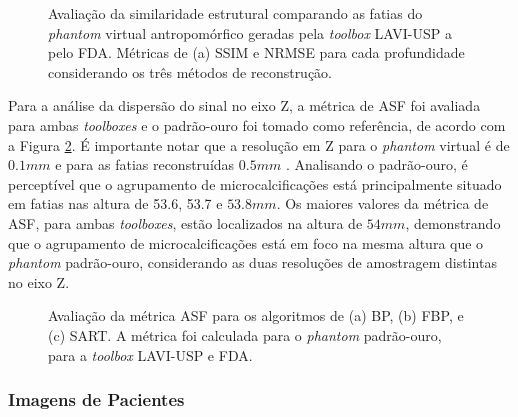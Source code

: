 \begin{figure}[!ht]
	\centering	
	\caption{ Avaliação da similaridade estrutural comparando as fatias do \textit{phantom} virtual antropomórfico geradas pela \textit{toolbox} LAVI-USP a pelo \acs{FDA}. Métricas de (a) \acs{SSIM} e \acs{NRMSE} para cada profundidade considerando os três métodos de reconstrução.}
	\hfill
	\label{fig:imgCap6VCTSSIMMSE}
\end{figure}


Para a análise da dispersão do sinal no eixo Z, a métrica de \acs{ASF} foi avaliada para ambas \textit{toolboxes} e o padrão-ouro foi tomado como referência, de acordo com a Figura \ref{fig:imgCap6VCTASF}. É importante notar que a resolução em Z para o \textit{phantom} virtual é de $0.1mm$ e para as fatias reconstruídas $0.5 mm$ . Analisando o padrão-ouro, é perceptível que o agrupamento de microcalcificações está principalmente situado em fatias nas altura de 53.6, 53.7 e $53.8mm$. Os maiores valores da métrica de \acs{ASF}, para ambas \textit{toolboxes}, estão localizados na altura de $54mm$, demonstrando que o agrupamento de microcalcificações está em foco na mesma altura que o \textit{phantom} padrão-ouro, considerando as duas resoluções de amostragem distintas no eixo Z.

\begin{figure}[!ht]
	
	\centering	
	\caption{ Avaliação da métrica \acs{ASF} para os algoritmos de (a) \acs{BP}, (b) \acs{FBP}, e (c) \acs{SART}. A métrica foi calculada para o \textit{phantom} padrão-ouro, para a \textit{toolbox} LAVI-USP e FDA.}
	\hfill


	\label{fig:imgCap6VCTASF}
\end{figure}


\subsubsection{Imagens de Pacientes}

